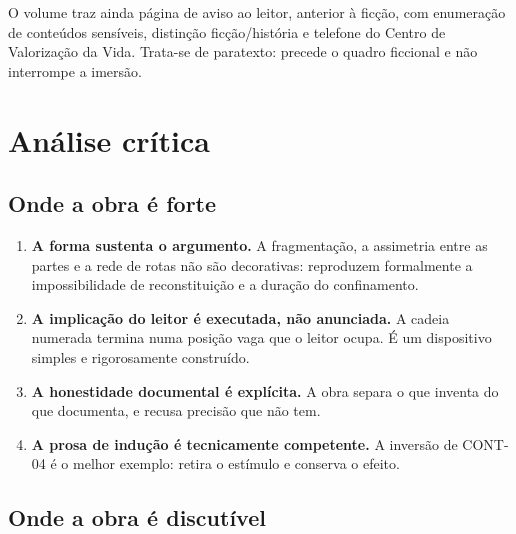 \documentclass[11pt,a4paper]{article}
\begin{document}
O volume traz ainda página de aviso ao leitor, anterior à ficção, com
enumeração de conteúdos sensíveis, distinção ficção/história e telefone do
Centro de Valorização da Vida. Trata-se de paratexto: precede o quadro
ficcional e não interrompe a imersão.

\section{Análise crítica}
\label{sec:critica}

\subsection{Onde a obra é forte}

\begin{enumerate}
\item \textbf{A forma sustenta o argumento.} A fragmentação, a assimetria
entre as partes e a rede de rotas não são decorativas: reproduzem
formalmente a impossibilidade de reconstituição e a duração do confinamento.

\item \textbf{A implicação do leitor é executada, não anunciada.} A cadeia
numerada termina numa posição vaga que o leitor ocupa. É um dispositivo
simples e rigorosamente construído.

\item \textbf{A honestidade documental é explícita.} A obra separa o que
inventa do que documenta, e recusa precisão que não tem.

\item \textbf{A prosa de indução é tecnicamente competente.} A inversão de
CONT-04 é o melhor exemplo: retira o estímulo e conserva o efeito.
\end{enumerate}

\subsection{Onde a obra é discutível}
\end{document}
